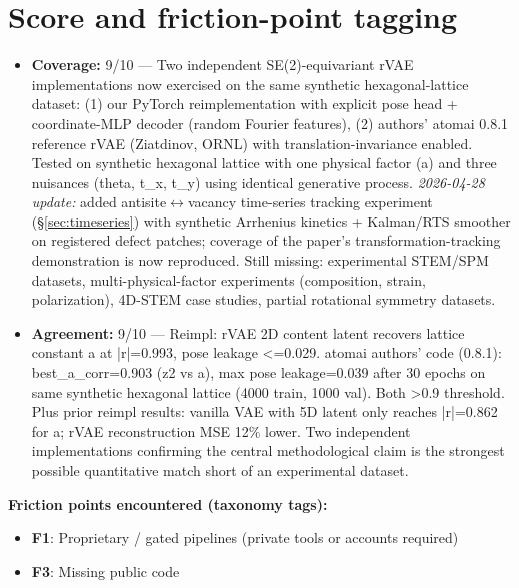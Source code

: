 \documentclass[11pt]{article}
\begin{document}
\section{Score and friction-point tagging}\label{sec:friction}
\begin{itemize}
\item \textbf{Coverage:} 9/10 --- Two independent SE(2)-equivariant rVAE implementations now exercised on the same synthetic hexagonal-lattice dataset: (1) our PyTorch reimplementation with explicit pose head + coordinate-MLP decoder (random Fourier features), (2) authors' atomai 0.8.1 reference rVAE (Ziatdinov, ORNL) with translation-invariance enabled. Tested on synthetic hexagonal lattice with one physical factor (a) and three nuisances (theta, t\_x, t\_y) using identical generative process. \emph{2026-04-28 update:} added antisite$\leftrightarrow$vacancy time-series tracking experiment (\S\ref{sec:timeseries}) with synthetic Arrhenius kinetics + Kalman/RTS smoother on registered defect patches; coverage of the paper's transformation-tracking demonstration is now reproduced. Still missing: experimental STEM/SPM datasets, multi-physical-factor experiments (composition, strain, polarization), 4D-STEM case studies, partial rotational symmetry datasets.
\item \textbf{Agreement:} 9/10 --- Reimpl: rVAE 2D content latent recovers lattice constant a at |r|=0.993, pose leakage \textless{}=0.029. atomai authors' code (0.8.1): best\_a\_corr=0.903 (z2 vs a), max pose leakage=0.039 after 30 epochs on same synthetic hexagonal lattice (4000 train, 1000 val). Both \textgreater{}0.9 threshold. Plus prior reimpl results: vanilla VAE with 5D latent only reaches |r|=0.862 for a; rVAE reconstruction MSE 12\% lower. Two independent implementations confirming the central methodological claim is the strongest possible quantitative match short of an experimental dataset.
\end{itemize}

\noindent\textbf{Friction points encountered (taxonomy tags):}
\begin{itemize}
\item \textbf{F1}: Proprietary / gated pipelines (private tools or accounts required)
\item \textbf{F3}: Missing public code
\end{itemize}
\end{document}
